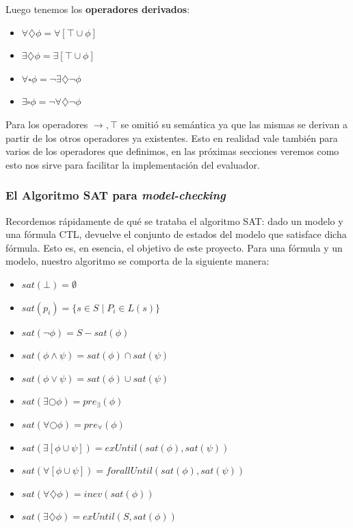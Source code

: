 \documentclass[11pt]{article}
\begin{document}
Luego tenemos los \textbf{operadores derivados}:

\begin{itemize}
  \item $\forall \diamondsuit \phi = \forall [\top \cup \phi]  $
  \item $\exists \diamondsuit \phi = \exists [\top \cup \phi] $
  \item $\forall \square \phi = \neg \exists \diamondsuit \neg \phi $
  \item $\exists \square \phi = \neg \forall \diamondsuit \neg \phi $
\end{itemize}

Para los operadores $\rightarrow, \top$ se omitió su semántica ya que las mismas
se derivan a partir de los otros operadores ya existentes. Esto en realidad vale
también para varios de los operadores que definimos, en las próximas secciones
veremos como esto nos sirve para facilitar la implementación del evaluador.

\subsubsection{El Algoritmo SAT para \emph{model-checking}}

Recordemos rápidamente de qué se trataba el algoritmo SAT: dado un modelo y una 
fórmula CTL, devuelve el conjunto de estados del modelo que satisface dicha 
fórmula. Esto es, en esencia, el objetivo de este proyecto. Para una fórmula
y un modelo, nuestro algoritmo se comporta de la siguiente manera:

\begin{itemize}
  \item $sat(\bot) = \emptyset$
  \item $sat(p_i) = \{s \in S \; | \; P_i \in L(s) \}$
  \item $sat(\neg \phi) = S - sat(\phi)$
  \item $sat(\phi \land \psi) = sat(\phi) \cap sat(\psi)$
  \item $sat(\phi \lor \psi) = sat(\phi) \cup sat(\psi)$
  \item $sat(\exists \bigcirc \phi) = pre_{\exists}(\phi)$
  \item $sat(\forall \bigcirc \phi) = pre_{\forall}(\phi)$
  \item $sat(\exists [\phi \cup \psi]) = exUntil(sat(\phi), sat(\psi))$
  \item $sat(\forall [\phi \cup \psi]) = forallUntil(sat(\phi), sat(\psi))$
  \item $sat(\forall \diamondsuit \phi) = inev(sat(\phi))$
  \item $sat(\exists \diamondsuit \phi) = exUntil(S, sat(\phi))$
\end{itemize}
\end{document}

